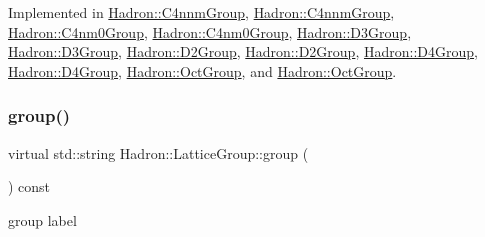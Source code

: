 Implemented in \mbox{\hyperlink{structHadron_1_1C4nnmGroup_a8cbcb161ddf801e759797f231db35f75}{Hadron\+::\+C4nnm\+Group}}, \mbox{\hyperlink{structHadron_1_1C4nnmGroup_a8cbcb161ddf801e759797f231db35f75}{Hadron\+::\+C4nnm\+Group}}, \mbox{\hyperlink{structHadron_1_1C4nm0Group_a700a48f1865a634b774127d8710e1ecc}{Hadron\+::\+C4nm0\+Group}}, \mbox{\hyperlink{structHadron_1_1C4nm0Group_a700a48f1865a634b774127d8710e1ecc}{Hadron\+::\+C4nm0\+Group}}, \mbox{\hyperlink{structHadron_1_1D3Group_a90ac88df35dd8e919637917dc22ee903}{Hadron\+::\+D3\+Group}}, \mbox{\hyperlink{structHadron_1_1D3Group_a90ac88df35dd8e919637917dc22ee903}{Hadron\+::\+D3\+Group}}, \mbox{\hyperlink{structHadron_1_1D2Group_aa7676a51e002eb654648c4d84585d6da}{Hadron\+::\+D2\+Group}}, \mbox{\hyperlink{structHadron_1_1D2Group_aa7676a51e002eb654648c4d84585d6da}{Hadron\+::\+D2\+Group}}, \mbox{\hyperlink{structHadron_1_1D4Group_aa4ca8a3f1bc6774b630cd6a354179298}{Hadron\+::\+D4\+Group}}, \mbox{\hyperlink{structHadron_1_1D4Group_aa4ca8a3f1bc6774b630cd6a354179298}{Hadron\+::\+D4\+Group}}, \mbox{\hyperlink{structHadron_1_1OctGroup_a1410a74894e1d12337548245c4e6fd47}{Hadron\+::\+Oct\+Group}}, and \mbox{\hyperlink{structHadron_1_1OctGroup_a1410a74894e1d12337548245c4e6fd47}{Hadron\+::\+Oct\+Group}}.

\mbox{\label{structHadron_1_1LatticeGroup_a82208a322bf1b1db489f16af38e70087}} 
\subsubsection{\texorpdfstring{group()}{group()}\hspace{0.1cm}{\footnotesize\ttfamily [1/2]}}
{\footnotesize\ttfamily virtual std\+::string Hadron\+::\+Lattice\+Group\+::group (\begin{DoxyParamCaption}{ }\end{DoxyParamCaption}) const\hspace{0.3cm}{\ttfamily [pure virtual]}}

group label 

